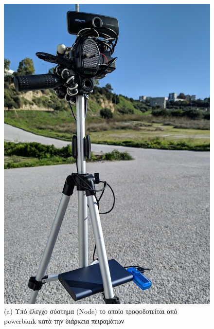 \begin{figure} [H]
	\centering
    \begin{minipage}{.5\textwidth}
      \centering
      \includegraphics[width=\linewidth, angle =-90]{../Images/Experiments-Results/node.jpg} \\ \vspace{0.1cm}
      {(a) Υπό έλεγχο σύστημα (Node) το οποίο τροφοδοτείται από powerbank κατά την διάρκεια πειραμάτων}
    \end{minipage}%
    \begin{minipage}{.5\textwidth}
      \centering

\end{minipage}
\end{figure}
